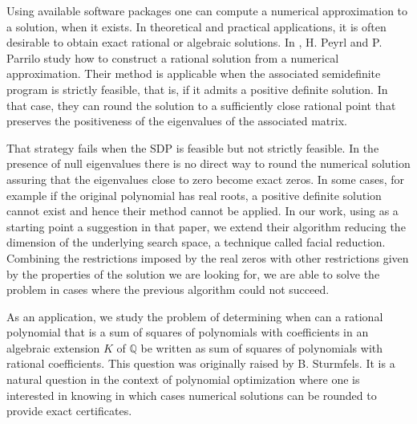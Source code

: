 \documentclass{amsart}
\theoremstyle{definition}
\theoremstyle{remark}
\numberwithin{equation}{section}
\newcommand{\Q}{{\mathbb Q}}
\begin{document}
Using available software packages one can compute a numerical approximation to a solution, when it exists.  In theoretical and practical applications, it is often desirable to obtain exact rational or algebraic solutions. In \cite{parrilo}, H. Peyrl and P. Parrilo study how to construct a rational solution from a numerical approximation. Their method is applicable when the associated semidefinite program is strictly feasible, that is, if it admits a positive definite solution. In that case, they can round the solution to a sufficiently close rational point that preserves the positiveness of the eigenvalues of the associated matrix.

That strategy fails when the SDP is feasible but not strictly feasible. In the presence of null eigenvalues there is no direct way to round the numerical solution assuring that the eigenvalues close to zero become exact zeros. In some cases, for example if the original polynomial has real roots, a positive definite solution cannot exist and hence their method cannot be applied. In our work, using as a starting point a suggestion in that paper, we extend their algorithm reducing the dimension of the underlying search space, a technique called facial reduction. Combining the restrictions imposed by the real zeros with other restrictions given by the properties of the solution we are looking for, we are able to solve the problem in cases where the previous algorithm could not succeed.

As an application, we study the problem of determining when can a rational polynomial that is a sum of squares of polynomials with coefficients in an algebraic extension $K$ of $\Q$ be written as sum of squares of polynomials with rational coefficients. This question was originally raised by B. Sturmfels. It is a natural question in the context of polynomial optimization where one is interested in knowing in which cases numerical solutions can be rounded to provide exact certificates.
\end{document}
